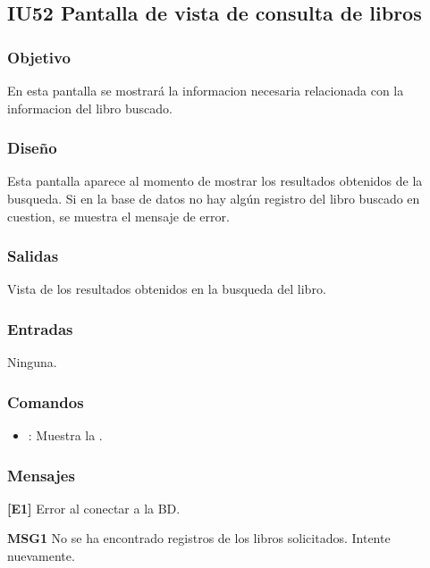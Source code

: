 \newpage
\subsection{IU52 Pantalla de vista de consulta de libros}

\subsubsection{Objetivo}
	En esta pantalla se mostrará la informacion necesaria relacionada con la informacion del libro buscado.  

\subsubsection{Diseño}
	Esta pantalla aparece al momento de mostrar los resultados obtenidos de la busqueda.
	Si en la base de datos no hay algún registro del libro buscado en cuestion, se muestra el mensaje de error. 


\subsubsection{Salidas}
	\begin{Citemize}
		\item Vista de los resultados obtenidos en la busqueda del libro.
	\end{Citemize}
	
\subsubsection{Entradas}
	\begin{Citemize}
		\item Ninguna.
	\end{Citemize}

\subsubsection{Comandos}
\begin{itemize}
	\item {}: Muestra la .
\end{itemize}

\subsubsection{Mensajes}
	\begin{Citemize}
		\item {\bf [E1]} Error al conectar a la BD.
		\item {\bf MSG1} No se ha encontrado registros de los libros solicitados. Intente nuevamente.
	\end{Citemize}
\newpage
